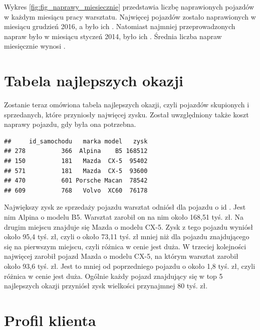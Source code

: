 \documentclass{article}\usepackage[]{graphicx}\usepackage[]{xcolor}
\makeatletter
\newenvironment{kframe}{%
 \def\at@end@of@kframe{}%
 \ifinner\ifhmode%
  \def\at@end@of@kframe{\end{minipage}}%
  \begin{minipage}{\columnwidth}%
 \fi\fi%
 \def\FrameCommand##1{\hskip\@totalleftmargin \hskip-\fboxsep
 \colorbox{shadecolor}{##1}\hskip-\fboxsep
     \hskip-\linewidth \hskip-\@totalleftmargin \hskip\columnwidth}%
 \MakeFramed {\advance\hsize-\width
   \@totalleftmargin\z@ \linewidth\hsize
   \@setminipage}}%
 {\par\unskip\endMakeFramed%
 \at@end@of@kframe}
\newenvironment{knitrout}{}{} %
\makeatother
\begin{document}
Wykres \ref{fig:fig_naprawy_miesiecznie} przedstawia liczbę naprawionych pojazdów w każdym miesiącu pracy warsztatu. Najwięcej pojazdów zostało naprawionych w miesiącu 
grudzień 2016,
a było ich . Natomiast najmniej przeprowadzonych napraw było w miesiącu
styczeń 2014,
było ich . Średnia liczba napraw miesięcznie wynosi 
. 

\section{Tabela najlepszych okazji}

Zostanie teraz omówiona tabela najlepszych okazji, czyli pojazdów skupionych i sprzedanych, które przyniosły najwięcej zysku. Został uwzględniony także koszt naprawy pojazdu, gdy była ona potrzebna.





\begin{knitrout}
\color{fgcolor}\begin{kframe}
\begin{verbatim}
##     id_samochodu   marka model   zysk
## 278          366  Alpina    B5 168512
## 150          181   Mazda  CX-5  95402
## 571          181   Mazda  CX-5  93600
## 470          601 Porsche Macan  78542
## 609          768   Volvo  XC60  76178
\end{verbatim}
\end{kframe}
\end{knitrout}

Największy zysk ze sprzedaży pojazdu warsztat odniósł dla pojazdu o id . Jest nim Alpina o modelu B5. Warsztat zarobił on na nim około 168,51 tyś. zł. 
Na drugim miejscu znajduje się Mazda o modelu CX-5. Zysk z tego pojazdu wyniósł około 95,4 tyś. zł, czyli o około 73,11 tyś. zł mniej niż dla pojazdu znajdującego się na pierwszym miejscu, czyli różnica w cenie jest duża.
W trzeciej kolejności najwięcej zarobił pojazd Mazda o modelu CX-5, na którym warsztat zarobił około 93,6 tyś. zł. Jest to mniej od poprzedniego pojazdu o około 1,8 tyś. zł, czyli różnica w cenie jest duża. 
Ogólnie każdy pojazd znajdujący się w top 5 najlepszych okazji przyniósł zysk wielkości przynajmnej 80 tyś. zł.

\section{Profil klienta}
\end{document}
